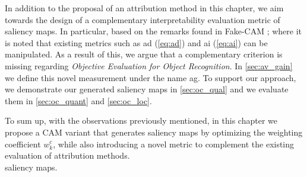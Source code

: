 \noindent In addition to the proposal of an attribution method in this chapter, we aim towards the 
design of a complementary interpretability evaluation metric of saliency maps. In particular, 
based on the remarks found in Fake-CAM \autocite{poppi2021revisiting}; where it is noted that 
existing metrics such as \gls{ad} (\ref{eq:ad}) and \gls{ai} (\ref{eq:ai}) can be manipulated. As a 
result of this, we argue that a complementary criterion is missing regarding \textit{Objective 
Evaluation for Object Recognition}. In \autoref{sec:av_gain} we define this novel measurement 
under the name \gls{ag}. To support our approach, we demonstrate our generated saliency maps in 
\autoref{sec:oc_qual} and we evaluate them in \autoref{sec:oc_quant} and \autoref{sec:oc_loc}.

\noindent To sum up, with the observations previously mentioned, in this chapter we propose a CAM 
variant that generates saliency maps by optimizing the weighting coefficient $w_k^c$, while also 
introducing a novel metric to complement the existing evaluation of attribution methods.\\





 saliency maps.

\newpage

\newpage








